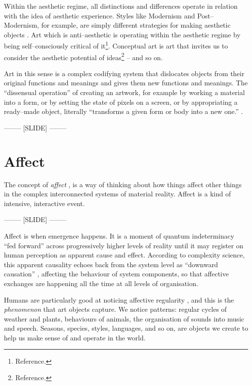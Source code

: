 \documentclass[letter:wpaper]{article}
\begin{document}
    Within the aesthetic regime, all distinctions and differences operate in relation with the idea of aesthetic experience. Styles like Modernism and Post–Modernism, for example, are simply different strategies for making aesthetic objects \citep[p213]{ZepkeSblmArt2017}. Art which is anti–aesthetic is operating within the aesthetic regime by being self–consciously critical of it\footnote{
        Reference.
    }. Conceptual art is art that invites us to consider the aesthetic potential of ideas\footnote{
        Reference.
    } -- and so on.

    Art in this sense is a complex codifying system that dislocates objects from their original functions and meanings and gives them new functions and meanings. The ``dissensual operation'' \citep[p.54]{RancierThEmncptdSpcttr2009} of creating an artwork, for example by working a material into a form, or by setting the state of pixels on a screen, or by appropriating a ready–made object, literally ``transforms a given form or body into a new one.'' \citep[p.54]{RancierThEmncptdSpcttr2009}.

-------- [SLIDE] --------

\section{Affect}

    The concept of \emph{affect} \citep{MassumiTheAtnmyOfAffct1995}, is a way of thinking about how things affect other things in the complex interconnected systems of material reality. Affect is a kind of intensive, interactive event.

-------- [SLIDE] --------

    Affect is when emergence happens. It is a moment of quantum indeterminacy ``fed forward'' across progressively higher levels of reality \citep[p.37]{MassumiPrblsFrThVrtl2002} until it may register on human perception as apparent cause and effect. According to complexity science, this apparent causality echoes back from the system level as ``downward causation'' \citep[p.?]{FlackCrsGrnng2017}, affecting the behaviour of system components, so that affective exchanges are happening all the time at all levels of organisation.
    
    Humans are particularly good at noticing affective regularity \citep{FristonThFrEnrgPrncpl2010} \citep{DeaconTheSymbolicSpecies1998}, and this is the \emph{phenomenon} that art objects capture. We notice patterns: regular cycles of weather and plants, behaviours of animals, the organisation of sounds into music and speech. Seasons, species, styles, languages, and so on, are objects we create to help us make sense of and operate in the world.
    
\end{document}
